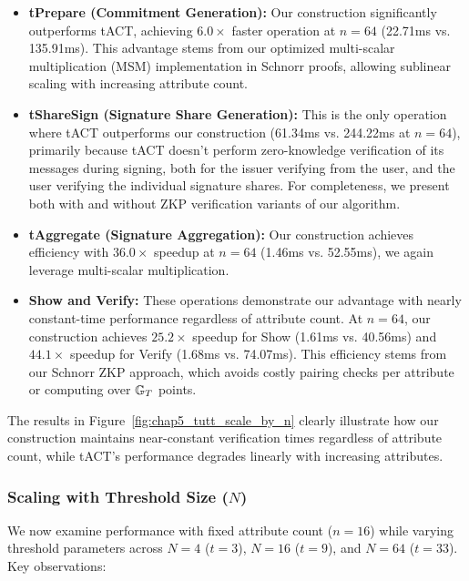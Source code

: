 \begin{itemize}
    \item \textbf{tPrepare (Commitment Generation):} Our construction significantly outperforms tACT, achieving $6.0\times$ faster operation at $n=64$ (22.71ms vs. 135.91ms). This advantage stems from our optimized multi-scalar multiplication (MSM) implementation in Schnorr proofs, allowing sublinear scaling with increasing attribute count.

    \item \textbf{tShareSign (Signature Share Generation):} This is the only operation where tACT outperforms our construction (61.34ms vs. 244.22ms at $n=64$), primarily because tACT doesn't perform zero-knowledge verification of its messages during signing, both for the issuer verifying from the user, and the user verifying the individual signature shares. For completeness, we present both with and without ZKP verification variants of our algorithm.

    \item \textbf{tAggregate (Signature Aggregation):} Our construction achieves  efficiency with $36.0\times$ speedup at $n=64$ (1.46ms vs. 52.55ms), we again leverage multi-scalar multiplication. 

    \item \textbf{Show and Verify:} These operations demonstrate our advantage with nearly constant-time performance regardless of attribute count. At $n=64$, our construction achieves $25.2\times$ speedup for Show (1.61ms vs. 40.56ms) and $44.1\times$ speedup for Verify (1.68ms vs. 74.07ms). This efficiency stems from our Schnorr ZKP approach, which avoids costly pairing checks per attribute or computing over $\mathbb{G}_T$ points.
\end{itemize}

The results in Figure~\ref{fig:chap5_tutt_scale_by_n} clearly illustrate how our construction maintains near-constant verification times regardless of attribute count, while tACT's performance degrades linearly with increasing attributes.


\subsubsection{Scaling with Threshold Size ($N$)}
We now examine performance with fixed attribute count ($n=16$) while varying threshold parameters across $N=4$ ($t=3$), $N=16$ ($t=9$), and $N=64$ ($t=33$). Key observations:



